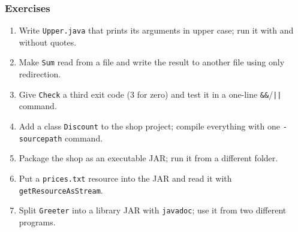 \documentclass[aspectratio=169,10pt,compress]{beamer}
\begin{document}
\begin{frame}[t,fragile] \frametitle{Exercises}
  \begin{enumerate}\small
    \item Write \texttt{Upper.java} that prints its arguments in upper case; run it with and without quotes.
    \item Make \texttt{Sum} read from a file and write the result to another file using only redirection.
    \item Give \texttt{Check} a third exit code (3 for zero) and test it in a one-line \texttt{\&\&}/\texttt{||} command.
    \item Add a class \texttt{Discount} to the shop project; compile everything with one \texttt{-sourcepath} command.
    \item Package the shop as an executable JAR; run it from a different folder.
    \item Put a \texttt{prices.txt} resource into the JAR and read it with \texttt{getResourceAsStream}.
    \item Split \texttt{Greeter} into a library JAR with \texttt{javadoc}; use it from two different programs.
  \end{enumerate}
\end{frame}




\begin{frame}[t,fragile]
	\begin{center}
		\vspace{4cm}
	\end{center}
\end{frame}
\end{document}
